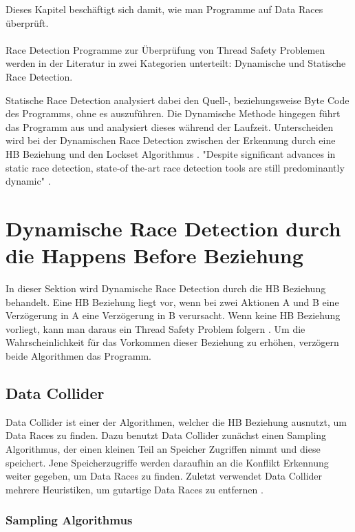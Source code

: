 Dieses Kapitel beschäftigt sich damit, wie man Programme auf Data Races überprüft.\\
\\
Race Detection Programme zur Überprüfung von Thread Safety Problemen werden in der Literatur in zwei Kategorien unterteilt: Dynamische und Statische Race Detection. 

Statische Race Detection analysiert dabei den Quell-, beziehungsweise Byte Code des Programms, ohne es auszuführen. Die Dynamische Methode hingegen führt das Programm aus und analysiert dieses während der Laufzeit. Unterscheiden wird bei der Dynamischen Race Detection zwischen der Erkennung durch eine \acs{HB} Beziehung und den Lockset Algorithmus \cite[vgl.][4]{erickson_effective_nodate}. "Despite significant advances in static race detection, state-of the-art race detection tools are still predominantly dynamic" \cite[308]{naik_effective_nodate}.

\section{Dynamische Race Detection durch die Happens Before Beziehung}

In dieser Sektion wird Dynamische Race Detection durch die \acs{HB} Beziehung behandelt. Eine \acs{HB} Beziehung liegt vor, wenn bei zwei Aktionen A und B eine Verzögerung in A eine Verzögerung in B verursacht. Wenn keine \acs{HB} Beziehung vorliegt, kann man daraus ein Thread Safety Problem folgern \cite[vgl.][163]{li_efficient_2019}. Um die Wahrscheinlichkeit für das Vorkommen dieser Beziehung zu erhöhen, verzögern beide Algorithmen das Programm.  

\subsection{Data Collider}

Data Collider ist einer der Algorithmen, welcher die \acs{HB} Beziehung ausnutzt, um Data Races zu finden. Dazu benutzt Data Collider zunächst einen Sampling Algorithmus, der einen kleinen Teil an Speicher Zugriffen nimmt und diese speichert. Jene Speicherzugriffe werden daraufhin an die Konflikt Erkennung weiter gegeben, um Data Races zu finden. Zuletzt verwendet Data Collider mehrere Heuristiken, um gutartige Data Races zu entfernen \cite[vgl.][6]{erickson_effective_nodate}.  

\subsubsection*{Sampling Algorithmus}

